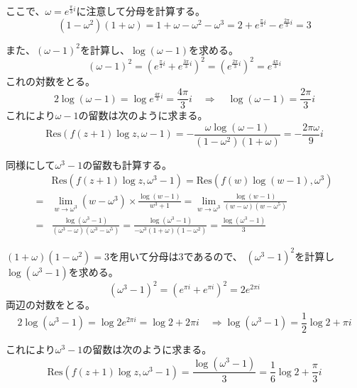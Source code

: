 \documentclass[12pt,b5paper]{ltjsarticle}
\begin{document}
ここで、$\omega= e^{\frac{\pi}{3}i}$に注意して分母を計算する。
\begin{equation}
 (1-\omega^2)(1+\omega)
  =1+\omega -\omega^2-\omega^3
  =2+e^{\frac{\pi}{3}i} -e^{\frac{2\pi}{3}i}
  =3
\end{equation}

また、$(\omega-1)^2$を計算し、$\log{(\omega-1)}$を求める。
\begin{equation}
 (\omega-1)^2
  = ( e^{\frac{\pi}{3}i} + e^{\frac{3\pi}{3}i})^2
  = ( e^{\frac{2\pi}{3}i} )^2
  = e^{\frac{4\pi}{3}i}
\end{equation}
これの対数をとる。
\begin{equation}
 2\log{(\omega-1)}
  = \log{ e^{\frac{4\pi}{3}i} }
  = \frac{4\pi}{3}i
  \quad \Rightarrow \quad
  \log{(\omega-1)} = \frac{2\pi}{3}i
\end{equation}
これにより$\omega-1$の留数は次のように求まる。
\begin{equation}
 \mathrm{Res}(f(z+1)\log{z},\omega-1)
  = -\frac{\omega\log{(\omega-1)}}{(1-\omega^2)(1+\omega)}
  = -\frac{ 2\pi\omega}{9}i
\end{equation}

同様にして$\omega^3-1$の留数も計算する。
\begin{align}
 & \mathrm{Res}(f(z+1)\log{z},\omega^3-1)
 =
 \mathrm{Res}(f(w)\log{(w-1)},\omega^3)\\
 =&
 \lim_{w\to \omega^3}(w-\omega^3)\times \frac{\log{(w-1)}}{w^3+1}
  =
 \lim_{w\to \omega^3} \frac{\log{(w-1)}}{(w-\omega)(w-\omega^5)}\\
 =&
 \frac{\log{(\omega^3-1)}}{(\omega^3-\omega)(\omega^3-\omega^5)}
 =
 \frac{\log{(\omega^3-1)}}{-\omega^3(1+\omega)(1-\omega^2)}
 =
 \frac{\log{(\omega^3-1)}}{3}
\end{align}

$(1+\omega)(1-\omega^2)=3$を用いて分母は$3$であるので、
$(\omega^3-1)^2$を計算し$\log{(\omega^3-1)}$を求める。
\begin{equation}
 (\omega^3-1)^2
  = (e^{\pi i} + e^{\pi i})^2
  = 2e^{2\pi i}
\end{equation}
両辺の対数をとる。
\begin{equation}
 2\log{(\omega^3-1)}
  = \log{2e^{2\pi i}}
  = \log{2} + 2\pi i
  \quad \Rightarrow
  \log{(\omega^3-1)}
  = \frac{1}{2}\log{2} + \pi i
\end{equation}

これにより$\omega^3-1$の留数は次のように求まる。
\begin{equation}
 \mathrm{Res}(f(z+1)\log{z},\omega^3-1)
  =
 \frac{\log{(\omega^3-1)}}{3}
  =
 \frac{1}{6}\log{2} + \frac{\pi}{3} i
\end{equation}
\end{document}
